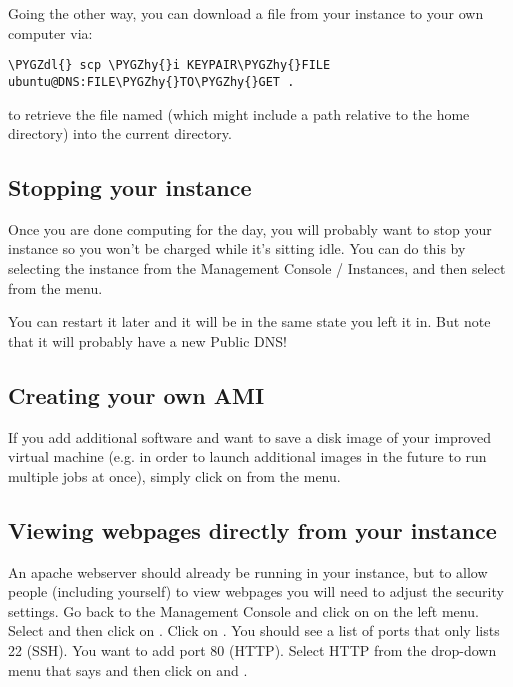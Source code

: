\documentclass[letterpaper,10pt,english]{sphinxmanual}
\def\PYGZdl{\char`\$}
\def\PYGZhy{\char`\-}
\begin{document}
Going the other way, you can download a file from your instance to
your own computer via:

\begin{Verbatim}[commandchars=\\\{\}]
\PYGZdl{} scp \PYGZhy{}i KEYPAIR\PYGZhy{}FILE ubuntu@DNS:FILE\PYGZhy{}TO\PYGZhy{}GET .
\end{Verbatim}

to retrieve the file named  (which might include a path
relative to the home directory) into the current directory.


\subsection{Stopping your instance}
\label{aws:stopping-your-instance}
Once you are done computing for the day, you will probably want to stop your
instance so you won't be charged while it's sitting idle.  You can do this
by selecting the instance from the Management Console / Instances, and then
select  from the  menu.

You can restart it later and it will be in the same state you left it in.
But note that it will probably have a new Public DNS!


\subsection{Creating your own AMI}
\label{aws:creating-your-own-ami}
If you add additional software and want to save a disk image of your
improved virtual machine (e.g. in order to launch additional images in the
future to run multiple jobs at once), simply click on  from the  menu.


\subsection{Viewing webpages directly from your instance}
\label{aws:viewing-webpages-directly-from-your-instance}
An apache webserver should already be running in your instance,
but to allow people (including yourself) to view
webpages you will need to adjust the security settings.  Go back to the
Management Console and click on  on the left menu.  Select
 and then click on .  Click on .
You should see a list of ports
that only lists 22 (SSH).  You want to add port 80 (HTTP).  Select HTTP from
the drop-down menu that says  and then click on 
and .
\end{document}
